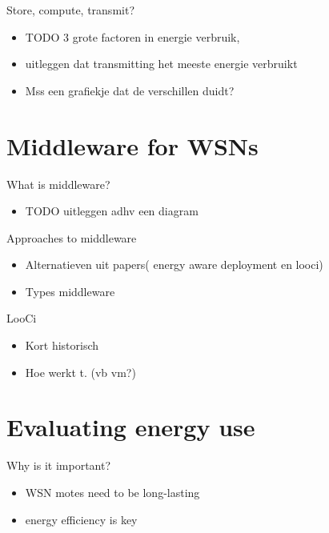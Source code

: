 \documentclass[presentation, bigger]{beamer}
\begin{document}
\begin{frame}[label=sec-1-5]{Store, compute, transmit?}
\begin{itemize}
\item TODO 3 grote factoren in energie verbruik,
\item uitleggen dat transmitting het meeste energie verbruikt
\item Mss een grafiekje dat de verschillen duidt?
\end{itemize}
\end{frame}
\section{Middleware for WSNs}
\label{sec-2}
\begin{frame}[label=sec-2-1]{What is middleware?}
\begin{itemize}
\item TODO uitleggen adhv een diagram
\end{itemize}
\end{frame}

\begin{frame}[label=sec-2-2]{Approaches to middleware}
\begin{itemize}
\item Alternatieven uit papers( energy aware deployment en looci)
\item Types middleware
\end{itemize}
\end{frame}

\begin{frame}[label=sec-2-3]{LooCi}
\begin{itemize}
\item Kort historisch
\item Hoe werkt t. (vb vm?)
\end{itemize}
\end{frame}
\section{Evaluating energy use}
\label{sec-3}

\begin{frame}[label=sec-3-1]{Why is it important?}
\begin{itemize}
\item WSN motes need to be long-lasting
\item energy efficiency is key
\end{itemize}
\end{frame}
\end{document}
